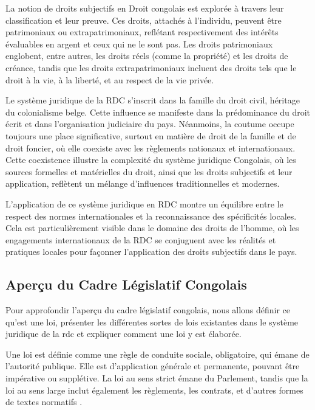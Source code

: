 La notion de droits subjectifs en Droit congolais est explorée à travers leur classification et leur preuve. Ces droits, attachés à l'individu, peuvent être patrimoniaux ou extrapatrimoniaux, reflétant respectivement des intérêts évaluables en argent et ceux qui ne le sont pas. Les droits patrimoniaux englobent, entre autres, les droits réels (comme la propriété) et les droits de créance, tandis que les droits extrapatrimoniaux incluent des droits tels que le droit à la vie, à la liberté, et au respect de la vie privée.

Le système juridique de la RDC s'inscrit dans la famille du droit civil, héritage du colonialisme belge. Cette influence se manifeste dans la prédominance du droit écrit et dans l'organisation judiciaire du pays. Néanmoins, la coutume occupe toujours une place significative, surtout en matière de droit de la famille et de droit foncier, où elle coexiste avec les règlements nationaux et internationaux. Cette coexistence illustre la complexité du système juridique Congolais, où les sources formelles et matérielles du droit, ainsi que les droits subjectifs et leur application, reflètent un mélange d'influences traditionnelles et modernes.

L'application de ce système juridique en RDC montre un équilibre entre le respect des normes internationales et la reconnaissance des spécificités locales. Cela est particulièrement visible dans le domaine des droits de l'homme, où les engagements internationaux de la RDC se conjuguent avec les réalités et pratiques locales pour façonner l'application des droits subjectifs dans le pays.


\subsection{Aperçu du Cadre Législatif Congolais}

Pour approfondir l'aperçu du cadre législatif congolais, nous allons définir ce qu'est une loi, présenter les différentes sortes de lois existantes dans le système juridique de la \ac{rdc} et expliquer comment une loi y est élaborée.

Une loi est définie comme une règle de conduite sociale, obligatoire, qui émane de l'autorité publique. Elle est d'application générale et permanente, pouvant être impérative ou supplétive. La loi au sens strict émane du Parlement, tandis que la loi au sens large inclut également les règlements, les contrats, et d'autres formes de textes normatifs .

